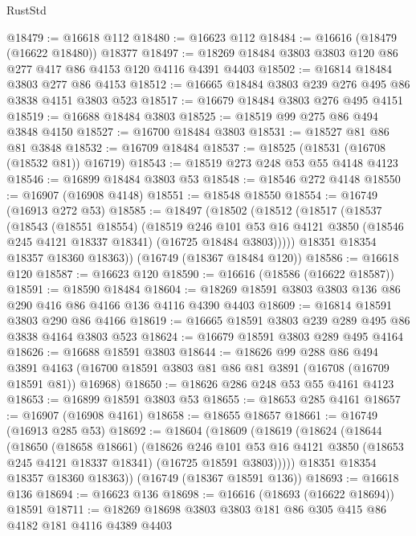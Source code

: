 \begin{lexlean}{RustStd}
\begin{coremodule}
@18479 := @16618 @112
@18480 := @16623 @112
@18484 := @16616 (@18479 (@16622 @18480)) @18377
@18497 := @18269 @18484 @3803 @3803 @120 @86 @277 @417 @86 @4153 @120 @4116 @4391 @4403
@18502 := @16814 @18484 @3803 @277 @86 @4153
@18512 := @16665 @18484 @3803 @239 @276 @495 @86 @3838 @4151 @3803 @523
@18517 := @16679 @18484 @3803 @276 @495 @4151
@18519 := @16688 @18484 @3803
@18525 := @18519 @99 @275 @86 @494 @3848 @4150
@18527 := @16700 @18484 @3803
@18531 := @18527 @81 @86 @81 @3848
@18532 := @16709 @18484
@18537 := @18525 (@18531 (@16708 (@18532 @81)) @16719)
@18543 := @18519 @273 @248 @53 @55 @4148 @4123
@18546 := @16899 @18484 @3803 @53
@18548 := @18546 @272 @4148
@18550 := @16907 (@16908 @4148)
@18551 := @18548 @18550
@18554 := @16749 (@16913 @272 @53)
@18585 := @18497
    (@18502
      (@18512
        (@18517
          (@18537
            (@18543
              (@18551 @18554)
              (@18519
                @246
                @101
                @53
                @16
                @4121
                @3850
                (@18546 @245 @4121 @18337 @18341)
                (@16725 @18484 @3803)))))
        @18351
        @18354
        @18357
        @18360
        @18363))
    (@16749 (@18367 @18484 @120))
@18586 := @16618 @120
@18587 := @16623 @120
@18590 := @16616 (@18586 (@16622 @18587))
@18591 := @18590 @18484
@18604 := @18269 @18591 @3803 @3803 @136 @86 @290 @416 @86 @4166 @136 @4116 @4390 @4403
@18609 := @16814 @18591 @3803 @290 @86 @4166
@18619 := @16665 @18591 @3803 @239 @289 @495 @86 @3838 @4164 @3803 @523
@18624 := @16679 @18591 @3803 @289 @495 @4164
@18626 := @16688 @18591 @3803
@18644 := @18626
    @99
    @288
    @86
    @494
    @3891
    @4163
    (@16700 @18591 @3803 @81 @86 @81 @3891 (@16708 (@16709 @18591 @81)) @16968)
@18650 := @18626 @286 @248 @53 @55 @4161 @4123
@18653 := @16899 @18591 @3803 @53
@18655 := @18653 @285 @4161
@18657 := @16907 (@16908 @4161)
@18658 := @18655 @18657
@18661 := @16749 (@16913 @285 @53)
@18692 := @18604
    (@18609
      (@18619
        (@18624
          (@18644
            (@18650
              (@18658 @18661)
              (@18626
                @246
                @101
                @53
                @16
                @4121
                @3850
                (@18653 @245 @4121 @18337 @18341)
                (@16725 @18591 @3803)))))
        @18351
        @18354
        @18357
        @18360
        @18363))
    (@16749 (@18367 @18591 @136))
@18693 := @16618 @136
@18694 := @16623 @136
@18698 := @16616 (@18693 (@16622 @18694)) @18591
@18711 := @18269 @18698 @3803 @3803 @181 @86 @305 @415 @86 @4182 @181 @4116 @4389 @4403

\end{coremodule}
\end{lexlean}
